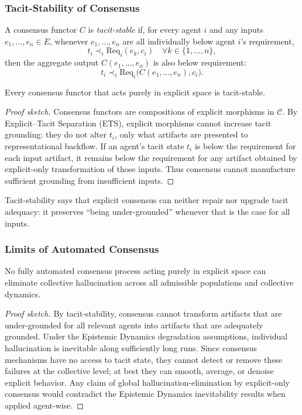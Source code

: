 \subsubsection{Tacit-Stability of Consensus}

\begin{definition}
A consensus functor $C$ is \emph{tacit-stable} if, for every agent $i$ and
any inputs $e_1,\dots,e_n \in E$, whenever $e_1,\dots,e_n$ are all
individually below agent $i$'s requirement,
\[
  t_i \prec_i \mathrm{Req}_i(e_k,c_i)
  \quad \forall k \in \{1,\dots,n\},
\]
then the aggregate output $C(e_1,\dots,e_n)$ is also below requirement:
\[
  t_i \prec_i \mathrm{Req}_i\bigl(C(e_1,\dots,e_n),c_i\bigr).
\]
\end{definition}

\begin{theorem}
Every consensus functor that acts purely in explicit space is tacit-stable.
\end{theorem}

\begin{proof}[Proof sketch]
Consensus functors are compositions of explicit morphisms in $\mathcal{C}$.
By Explicit--Tacit Separation (ETS), explicit morphisms cannot increase
tacit grounding: they do not alter $t_i$, only what artifacts are presented
to representational backflow. If an agent's tacit state $t_i$ is below the
requirement for each input artifact, it remains below the requirement for
any artifact obtained by explicit-only transformation of those inputs. Thus
consensus cannot manufacture sufficient grounding from insufficient inputs.
\end{proof}

Tacit-stability says that explicit consensus can neither repair nor upgrade
tacit adequacy: it preserves ``being under-grounded'' whenever that is the
case for all inputs.

\subsubsection{Limits of Automated Consensus}

\begin{theorem}
No fully automated consensus process acting purely in explicit space can
eliminate collective hallucination across all admissible populations and
collective dynamics.
\end{theorem}

\begin{proof}[Proof sketch]
By tacit-stability, consensus cannot transform artifacts that are
under-grounded for all relevant agents into artifacts that are adequately
grounded. Under the Epistemic Dynamics degradation assumptions, individual hallucination
is inevitable along sufficiently long runs. Since consensus mechanisms have no
access to tacit state, they cannot detect or remove these failures at the
collective level; at best they can smooth, average, or denoise explicit
behavior. Any claim of global hallucination-elimination by explicit-only
consensus would contradict the Epistemic Dynamics inevitability results when applied
agent-wise.
\end{proof}

